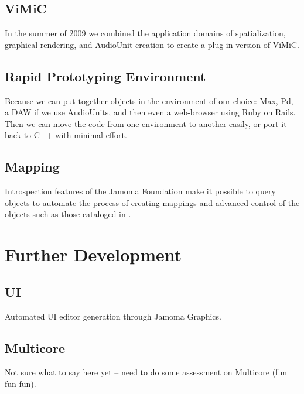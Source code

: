 \documentclass[twoside,10pt]{article}
\begin{document}
\subsection{ViMiC}
In the summer of 2009 we combined the application domains of spatialization, graphical rendering, and AudioUnit creation to create a plug-in version of ViMiC\cite{Peters:2008b}.


\subsection{Rapid Prototyping Environment}

Because we can put together objects in the environment of our choice: Max, Pd, a DAW if we use AudioUnits, and then even a web-browser using Ruby on Rails.  Then we can move the code from one environment to another easily, or port it back to C++ with minimal effort.

\subsection{Mapping}

Introspection features of the Jamoma Foundation make it possible to query objects to automate the process of creating mappings and advanced control of the objects such as those cataloged in \cite{Pendharkar:2006}.  




\section{Further Development} %

\subsection{UI}

Automated UI editor generation through Jamoma Graphics.

\subsection{Multicore}

Not sure what to say here yet -- need to do some assessment on Multicore (fun fun fun).
\end{document}
